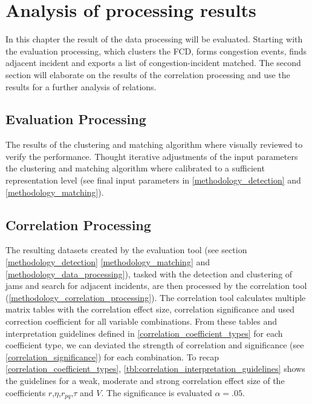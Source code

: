 \chapter{Analysis of processing results}
\label{analysis_processing}
In this chapter the result of the data processing will be evaluated. Starting with the evaluation processing, which clusters the FCD, forms congestion events, finds adjacent incident and exports a list of congestion-incident matched. The second section will elaborate on the results of the correlation processing and use the results for a further analysis of relations.

\section{Evaluation Processing}
\label{analysis_processing_evaluation}
The results of the clustering and matching algorithm where visually reviewed to verify the performance. Thought iterative adjustments of the input parameters the clustering and matching algorithm where calibrated to a sufficient representation level (see final input parameters in \cref{methodology_detection} and \cref{methodology_matching}).


\section{Correlation Processing}
\label{analysis_processing_correlation}
The resulting datasets created by the evaluation tool (see section \cref{methodology_detection} \cref{methodology_matching} and \cref{methodology_data_processing}), tasked with the detection and clustering of jams and search for adjacent incidents, are then processed by the correlation tool (\cref{methodology_correlation_processing}). The correlation tool calculates multiple matrix tables with the correlation effect size, correlation significance and used correction coefficient for all variable combinations. From these tables and interpretation guidelines defined in \cref{correlation_coefficient_types} for each coefficient type, we can deviated the strength of correlation and significance (see \cref{correlation_significance}) for each combination. To recap \cref{correlation_coefficient_types}, \cref{tbl:correlation_interpretation_guidelines} shows the guidelines for a weak, moderate and strong correlation effect size of the coefficients $r$,$\eta$,$r_{pq}$,$\tau$ and $V$. The significance is evaluated $\alpha=.05$.

